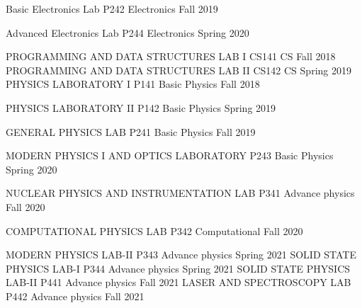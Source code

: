 


\begin{cvhonors}

  \cvhonor
    {Basic Electronics Lab} %
    {P242} %
    {Electronics } %
    {Fall 2019} %
    
  \cvhonor
    {Advanced Electronics Lab } %
    {P244} %
    {Electronics} %
    {Spring 2020} %
    
  \cvhonor
    {PROGRAMMING AND DATA STRUCTURES LAB I} %
    {CS141} %
    {CS} %
    {Fall 2018} %
  \cvhonor
    {PROGRAMMING AND DATA STRUCTURES LAB II} %
    {CS142} %
    {CS} %
    {Spring 2019} %
  \cvhonor
    {PHYSICS LABORATORY I} %
    {P141} %
    {Basic Physics} %
    {Fall 2018} %

  \cvhonor
    {PHYSICS LABORATORY II}
    {P142} %
    {Basic Physics} %
    {Spring 2019} %

  \cvhonor
{GENERAL PHYSICS LAB}
    {P241} %
    {Basic Physics} %
    {Fall 2019} %

  \cvhonor
{MODERN PHYSICS I AND OPTICS LABORATORY}
    {P243} %
    {Basic Physics} %
    {Spring 2020} %

  \cvhonor
{NUCLEAR PHYSICS AND INSTRUMENTATION LAB}
    {P341} %
    {Advance physics} %
    {Fall 2020} %

  \cvhonor
{COMPUTATIONAL PHYSICS LAB}
    {P342} %
    {Computational} %
    {Fall 2020} %

  \cvhonor
{MODERN PHYSICS LAB-II}
    {P343} %
    {Advance physics} %
    {Spring 2021} %
  \cvhonor
{SOLID STATE PHYSICS LAB-I}
    {P344} %
    {Advance physics} %
    {Spring 2021} %
  \cvhonor
{SOLID STATE PHYSICS LAB-II}
    {P441} %
    {Advance physics} %
    {Fall 2021} %
  \cvhonor
{LASER AND SPECTROSCOPY LAB}
    {P442} %
    {Advance physics} %
    {Fall 2021} %
\end{cvhonors}

